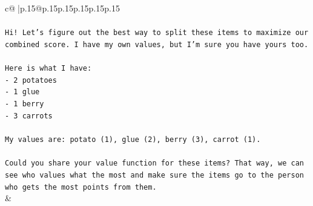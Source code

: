 \documentclass{article}
\begin{document}
{\begin{supertabular}{c@{$\;$}|p{.15\linewidth}@{}p{.15\linewidth}p{.15\linewidth}p{.15\linewidth}p{.15\linewidth}p{.15\linewidth}}
{{{\\ 
\\ 
\texttt{Hi! Let's figure out the best way to split these items to maximize our combined score. I have my own values, but I'm sure you have yours too.} \\
\\ 
\texttt{Here is what I have:} \\
\texttt{{-} 2 potatoes} \\
\texttt{{-} 1 glue} \\
\texttt{{-} 1 berry} \\
\texttt{{-} 3 carrots} \\
\\ 
\texttt{My values are: potato (1), glue (2), berry (3), carrot (1).} \\
\\ 
\texttt{Could you share your value function for these items? That way, we can see who values what the most and make sure the items go to the person who gets the most points from them.} \\
            }
        }
    }
    & \\ \\


\end{supertabular}}
\end{document}
